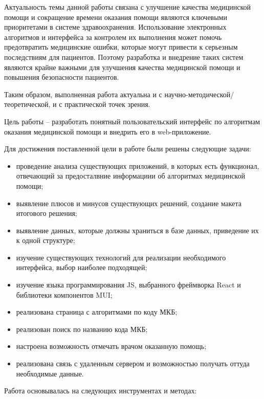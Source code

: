 Актуальность темы данной работы связана с улучшение качества медицинской помощи и сокращение времени оказания помощи являются ключевыми приоритетами в системе здравоохранения. Использование электронных алгоритмов и интерфейса за контролем их выполнения может помочь предотвратить медицинские ошибки, которые могут привести к серьезным последствиям для пациентов. Поэтому разработка и внедрение таких систем являются крайне важными для улучшения качества медицинской помощи и повышения безопасности пациентов.

Таким образом, выполненная работа актуальна и с научно-методической/теоретической, и с практической точек зрения.


Цель работы – разработать понятный пользовательский интерфейс по алгоритмам оказания медицинской помощи и внедрить его в web-приложение.


Для достижения поставленной цели в работе были решены следующие задачи:
\begin{itemize}
    \item проведение анализа существующих приложений, в которых есть функционал, отвечающий за предосталвние информациии об алгоритмах медицинской помощи;
    \item выявление плюсов и минусов существующих решений, создание макета итогового решения;
    \item выявление данных, которые должны храниться в базе данных, приведение их к одной структуре;
    \item изучение существующих технологий для реализации необходимого интерфейса, выбор наиболее подходящей;
    \item изучение языка программирования JS, выбранного фреймворка React и библиотеки компонентов MUI;
    \item реализована страница с алгоритмами по коду МКБ;
    \item реализован поиск по названию кода МКБ;
    \item настроена возможность отмечать врачом оказанную помощь;
    \item реализована связь с удаленным сервером и возможностью получать оттуда необходимые данные.
\end{itemize}


Работа основывалась на следующих инструментах и методах: 

